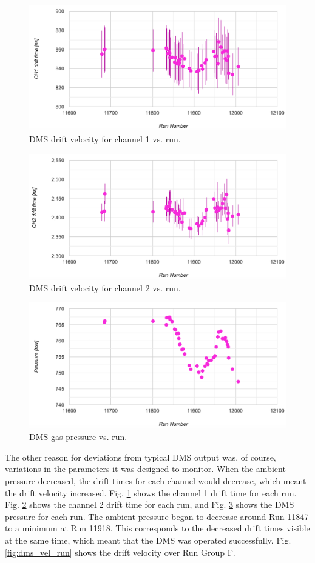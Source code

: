 \begin{figure}[h!]
	\centering
	\includegraphics[width=0.9\linewidth]{figures/DMS_ch1_run.png}
	\caption{DMS drift velocity for channel 1 vs. run.}
	\label{fig:dms_ch1_run}
\end{figure}
\begin{figure}[h!]
	\centering
	\includegraphics[width=0.9\linewidth]{figures/DMS_ch2_run.png}
	\caption{DMS drift velocity for channel 2 vs. run.}
	\label{fig:dms_ch2_run}
\end{figure}
\begin{figure}[h!]
	\centering
	\includegraphics[width=0.9\linewidth]{figures/DMS_pres_run.png}
	\caption{DMS gas pressure vs. run.}
	\label{fig:dms_pres_run}
\end{figure}

The other reason for deviations from typical DMS output was, of course, variations in the parameters it was designed to monitor. When the ambient pressure decreased, the drift times for each channel would decrease, which meant the drift velocity increased. Fig. \ref{fig:dms_ch1_run} shows the channel 1 drift time for each run. Fig. \ref{fig:dms_ch2_run} shows the channel 2 drift time for each run, and Fig. \ref{fig:dms_pres_run} shows the DMS pressure for each run. The ambient pressure began to decrease around Run 11847 to a minimum at Run 11918. This corresponds to the decreased drift times visible at the same time, which meant that the DMS was operated successfully. Fig. \ref{fig:dms_vel_run} shows the drift velocity over Run Group F.
 
